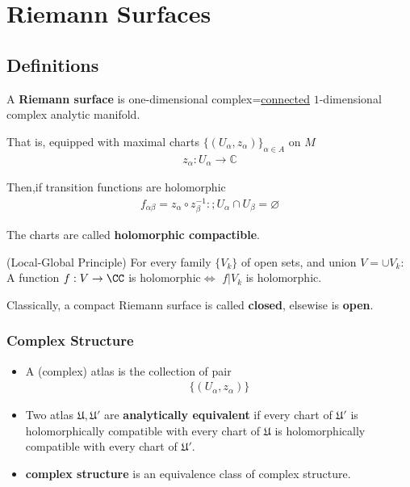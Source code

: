 \documentclass[Total.tex]{subfiles}
\begin{document}
	
	\chapter{Riemann Surfaces}
		\section{Definitions}
		
			\begin{Def}
				A \textbf{Riemann surface} is one-dimensional complex=\underline{connected} $1$-dimensional complex analytic manifold.
				
				That is, equipped with maximal charts $\{(U_\alpha,z_\alpha)\}_{\alpha\in A}$ on $M$ 
				\begin{gather*}
					z_\alpha:U_\alpha\rightarrow \mathbb{C}
				\end{gather*}
				
				Then,if  transition functions are holomorphic
				\begin{gather*}
					f_{\alpha\beta}=z_\alpha\circ z_\beta^{-1}:;U_\alpha\cap U_\beta=\varnothing
				\end{gather*}
				
				The charts are called \textbf{holomorphic compactible}.
			\end{Def}
			
			\begin{lemma}
				(Local-Global Principle) For every family $\{V_k\}$ of open sets, and union $V=\cup V_k$: A function $f:V\rightarrow \CC$ is holomorphic$\Leftrightarrow$ $f|V_k$ is holomorphic.
			\end{lemma}
			
			\begin{Def}
				Classically, a compact Riemann surface is called \textbf{closed}, elsewise is \textbf{open}.
			\end{Def}
			
			\subsection{Complex Structure}
			\begin{Def}
				\begin{itemize}
					\item A (complex) atlas is the collection of pair
					\begin{gather*}
						\{(U_\alpha,z_\alpha)\}
					\end{gather*}
					\item Two atlas $\mathfrak{U},\mathfrak{U}'$ are \textbf{analytically equivalent} if every chart of $\mathfrak{U}'$ is holomorphically compatible with every chart of $\mathfrak{U}$ is holomorphically compatible with every chart of $\mathfrak{U}'$. 
					\item \textbf{complex structure} is an equivalence class of complex structure. 
				\end{itemize}
			\end{Def}
			
\end{document}
